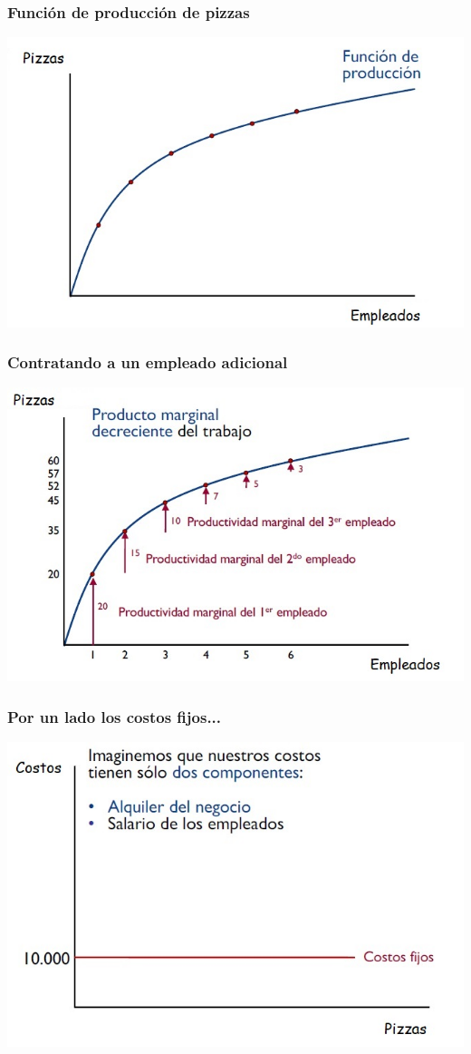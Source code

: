 \documentclass{beamer}
\begin{document}
\begin{frame}
\frametitle{Función de producción de pizzas}
\centering
\includegraphics[scale=0.6]{Figures/Tema_06.15.jpg}
\end{frame}

\begin{frame}
\frametitle{ Contratando a un empleado adicional}
\centering
\includegraphics[scale=0.6]{Figures/Tema_06.16.jpg}
\end{frame}


\begin{frame}
\frametitle{Por un lado los costos fijos...}
\centering
\includegraphics[scale=0.6]{Figures/Tema_06.17.jpg}
\end{frame}
\end{document}
